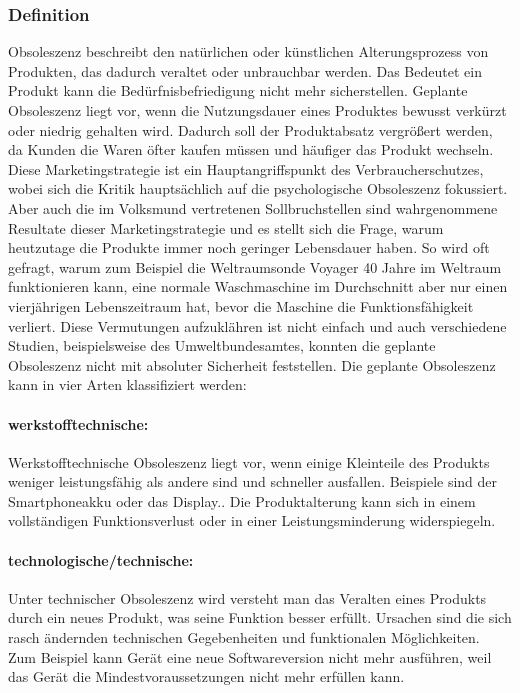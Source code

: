 \documentclass[13pt,titlepage]{article}
\begin{document}
	\subsubsection {Definition}
	Obsoleszenz beschreibt den nat\"urlichen oder k\"unstlichen Alterungsprozess von Produkten, das dadurch veraltet oder unbrauchbar werden. 
Das Bedeutet ein Produkt kann die Bed\"urfnisbefriedigung nicht mehr sicherstellen.
Geplante Obsoleszenz liegt vor, wenn die Nutzungsdauer eines Produktes bewusst verkürzt oder niedrig gehalten wird. 
Dadurch soll der Produktabsatz vergrößert werden, da Kunden die Waren \"ofter kaufen m\"ussen und h\"aufiger das Produkt wechseln. 
Diese Marketingstrategie ist ein Hauptangriffspunkt des Verbraucherschutzes, wobei sich die Kritik hauptsächlich auf die psychologische Obsoleszenz fokussiert. 
Aber auch die im Volksmund vertretenen Sollbruchstellen sind wahrgenommene Resultate dieser Marketingstrategie und es stellt sich die Frage, warum heutzutage die Produkte immer noch geringer Lebensdauer haben. 
So wird oft gefragt, warum zum Beispiel die Weltraumsonde Voyager 40 Jahre im Weltraum funktionieren kann, eine normale Waschmaschine im Durchschnitt aber nur einen vierjährigen Lebenszeitraum hat, bevor die Maschine die Funktionsf\"ahigkeit verliert. 
Diese Vermutungen aufzukl\"ahren ist nicht einfach und auch verschiedene Studien, beispielsweise des Umweltbundesamtes\protect\footnotemark{}, konnten die geplante Obsoleszenz nicht mit absoluter Sicherheit feststellen.
Die geplante Obsoleszenz kann in vier Arten klassifiziert werden:
	
	\paragraph {werkstofftechnische:}
	Werkstofftechnische Obsoleszenz liegt vor, wenn einige Kleinteile des Produkts weniger leistungsfähig als andere sind und schneller ausfallen. Beispiele sind der Smartphoneakku oder das Display.\protect\footnotemark{}. Die Produktalterung kann sich in einem vollständigen Funktionsverlust oder in einer Leistungsminderung widerspiegeln.
	\paragraph {technologische/technische:}
	Unter technischer Obsoleszenz wird versteht man das Veralten eines Produkts durch ein neues Produkt, was seine Funktion besser erfüllt. Ursachen sind die sich rasch ändernden technischen Gegebenheiten und funktionalen M\"oglichkeiten.
Zum Beispiel kann Gerät eine neue Softwareversion nicht mehr ausführen, weil das Gerät die Mindestvoraussetzungen nicht mehr erfüllen kann.
\end{document}
